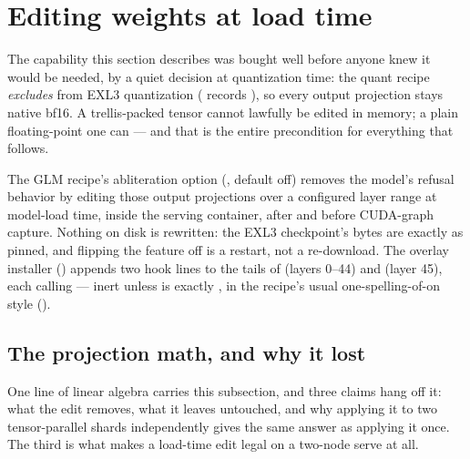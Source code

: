 \section{Editing weights at load time}

The capability this section describes was bought well before anyone knew
it would be needed, by a quiet decision at quantization time: the quant
recipe \emph{excludes}  from EXL3 quantization
( records
), so every output projection
stays native bf16. A trellis-packed tensor cannot lawfully be edited in
memory; a plain floating-point one can --- and that is the entire
precondition for everything that follows.

The GLM recipe's abliteration option (, default off) removes
the model's refusal behavior by editing those output projections over a
configured layer range at model-load time, inside the serving container,
after  and before CUDA-graph capture. Nothing on disk is
rewritten: the EXL3 checkpoint's bytes are exactly as pinned, and flipping
the feature off is a restart, not a re-download. The overlay installer
() appends two hook lines to the tails of
 (layers 0--44) and
 (layer 45), each calling
 --- inert unless  is exactly ,
in the recipe's usual one-spelling-of-on style ().

\subsection{The projection math, and why it lost}

One line of linear algebra carries this subsection, and three claims hang off
it: what the edit removes, what it leaves untouched, and why applying it to
two tensor-parallel shards independently gives the same answer as applying it
once. The third is what makes a load-time edit legal on a two-node serve at
all.

